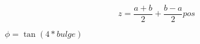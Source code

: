 \documentclass{article}
\begin{document}
\[ z = \frac{a + b}{2} + \frac{b - a}{2} pos \]
\pagebreak

$ \phi = \tan(4 * bulge) $
\pagebreak
\end{document}
